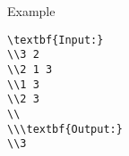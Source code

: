 Example
\begin{verbatim}
\textbf{Input:}
\\3 2
\\2 1 3
\\1 3
\\2 3
\\
\\\textbf{Output:}
\\3\end{verbatim}
